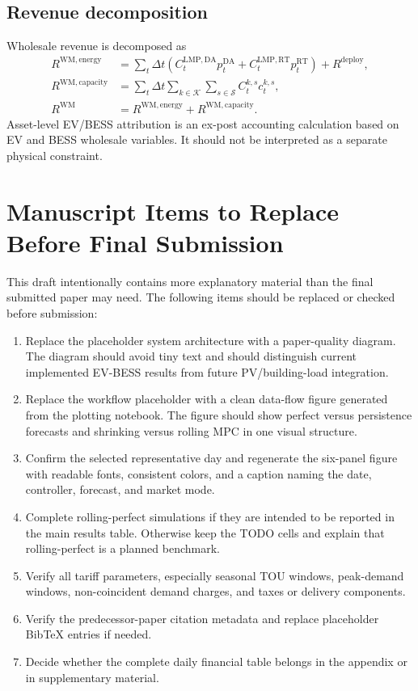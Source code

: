 \documentclass[final,5p,times]{elsarticle}
\newcommand{\DeltaT}{\Delta t}
\newcommand{\DA}{\mathrm{DA}}
\newcommand{\RT}{\mathrm{RT}}
\newcommand{\WM}{\mathrm{WM}}
\newcommand{\energy}{\mathrm{energy}}
\newcommand{\capacity}{\mathrm{capacity}}
\newcommand{\calK}{\mathcal{K}}
\newcommand{\calS}{\mathcal{S}}
\begin{document}
\subsection{Revenue decomposition}
Wholesale revenue is decomposed as
\begin{align}
R^{\WM,\energy}&=\sum_t\DeltaT\left(C_t^{\mathrm{LMP},\DA}p_t^{\DA}+C_t^{\mathrm{LMP},\RT}p_t^{\RT}\right)+R^{\mathrm{deploy}},\label{eq:app_energy_rev}\\
R^{\WM,\capacity}&=\sum_t\DeltaT\sum_{k\in\calK}\sum_{s\in\calS}C_t^{k,s}c_t^{k,s},\label{eq:app_capacity_rev}\\
R^{\WM}&=R^{\WM,\energy}+R^{\WM,\capacity}.\label{eq:app_total_rev}
\end{align}
Asset-level EV/BESS attribution is an ex-post accounting calculation based on EV and BESS wholesale variables. It should not be interpreted as a separate physical constraint.



\section{Manuscript Items to Replace Before Final Submission}
\label{app:replacement_items}

This draft intentionally contains more explanatory material than the final submitted paper may need. The following items should be replaced or checked before submission:
\begin{enumerate}[leftmargin=*]
\item Replace the placeholder system architecture with a paper-quality diagram. The diagram should avoid tiny text and should distinguish current implemented EV-BESS results from future PV/building-load integration.
\item Replace the workflow placeholder with a clean data-flow figure generated from the plotting notebook. The figure should show perfect versus persistence forecasts and shrinking versus rolling MPC in one visual structure.
\item Confirm the selected representative day and regenerate the six-panel figure with readable fonts, consistent colors, and a caption naming the date, controller, forecast, and market mode.
\item Complete rolling-perfect simulations if they are intended to be reported in the main results table. Otherwise keep the TODO cells and explain that rolling-perfect is a planned benchmark.
\item Verify all tariff parameters, especially seasonal TOU windows, peak-demand windows, non-coincident demand charges, and taxes or delivery components.
\item Verify the predecessor-paper citation metadata and replace placeholder BibTeX entries if needed.
\item Decide whether the complete daily financial table belongs in the appendix or in supplementary material.
\end{enumerate}
\end{document}
